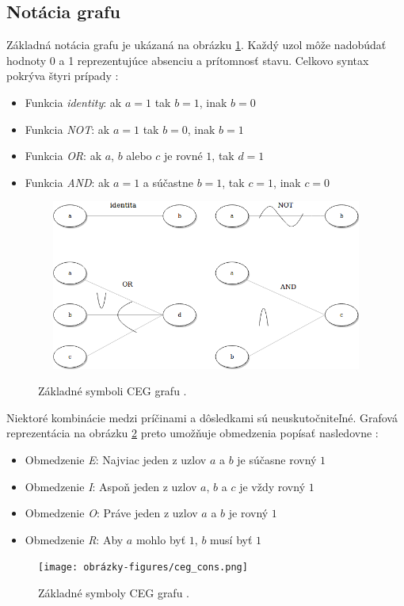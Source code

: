 \subsection*{Notácia grafu}
Základná notácia grafu je ukázaná na obrázku \ref{ceg_img}. Každý uzol môže nadobúdať hodnoty 0 a 1 reprezentujúce absenciu a prítomnosť stavu. Celkovo syntax pokrýva štyri prípady \cite{Ast}: 
\begin{itemize}
	\item{Funkcia \textit{identity}: ak \(a = 1\) tak \(b = 1\), inak \(b = 0\) 
	}
	\item{Funkcia \textit{NOT}: ak \(a = 1\) tak \(b = 0\), inak \(b = 1\) 
	}
	\item{Funkcia \textit{OR}: ak \(a\), \(b\) alebo \(c\) je rovné \(1\), tak \(d = 1\) 
	} 		
	\item{Funkcia \textit{AND}: ak \(a = 1\) a súčastne \(b = 1\), tak \(c = 1\), inak \(c = 0\)  
	} 
\end{itemize}
\begin{figure}[h]\centering
	\centering
	\includegraphics[width=4.5in,height=2.2in]{obrazky-figures/ceg.png}\\[1pt]
	\caption{Základné symboli CEG grafu \cite{Ast}.}
	\label{ceg_img}
\end{figure}
Niektoré kombinácie medzi príčinami a dôsledkami sú neuskutočniteľné. Grafová reprezentácia na obrázku \ref{ceg_cons_img} preto umožňuje obmedzenia popísať nasledovne \cite{Ast}:
\begin{itemize}
	\item{Obmedzenie \textit{E}: Najviac jeden z uzlov \(a\) a \(b\) je súčasne rovný \(1\) 
	}
	\item{Obmedzenie \textit{I}: Aspoň jeden z uzlov \(a\), \(b\) a \(c\) je vždy rovný \(1\) 
	}
	\item{Obmedzenie \textit{O}: Práve jeden z uzlov \(a\) a \(b\) je  rovný \(1\) 
	} 		
	\item{Obmedzenie \textit{R}: Aby \(a\) mohlo byť \(1\), \(b\) musí byť \(1\) 
	}
\end{itemize}    
\begin{figure}[h]\centering
	\centering
	\texttt{[image: obrázky-figures/ceg\_cons.png]}\\[1pt]
	\caption{Základné symboly CEG grafu \cite{Ast}.}
	\label{ceg_cons_img}
\end{figure} 


